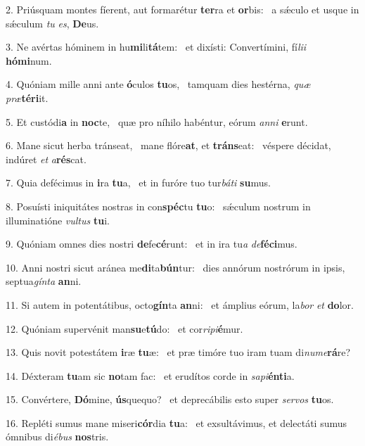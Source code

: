 2. Priúsquam montes fíerent, aut formarétur \textbf{ter}ra et \textbf{or}bis: \ast\  a sǽculo et usque in sǽculum \textit{tu} \textit{es}, \textbf{De}us.\

3. Ne avértas hóminem in hu\textbf{mi}li\textbf{tá}tem: \ast\  et dixísti: Convertímini, fí\textit{li}\textit{i} \textbf{hó}\textbf{mi}num.\

4. Quóniam mille anni ante \textbf{ó}culos \textbf{tu}os, \ast\  tamquam dies hestérna, \textit{quæ} \textit{præ}\textbf{tér}\textbf{i}it.\

5. Et custódi\textbf{a} in \textbf{noc}te, \ast\  quæ pro níhilo habéntur, eórum \textit{an}\textit{ni} \textbf{e}runt.\

6. Mane sicut herba tránseat, \dag\  mane flóre\textbf{at}, et \textbf{tráns}eat: \ast\  véspere décidat, indúret \textit{et} \textit{a}\textbf{rés}cat.\

7. Quia defécimus in \textbf{i}ra \textbf{tu}a, \ast\  et in furóre tuo tur\textit{bá}\textit{ti} \textbf{su}mus.\

8. Posuísti iniquitátes nostras in con\textbf{spéc}tu \textbf{tu}o: \ast\  sǽculum nostrum in illuminatióne \textit{vul}\textit{tus} \textbf{tu}i.\

9. Quóniam omnes dies nostri \textbf{de}fe\textbf{cé}runt: \ast\  et in ira tu\textit{a} \textit{de}\textbf{fé}\textbf{ci}mus.\

10. Anni nostri sicut aránea me\textbf{di}ta\textbf{bún}tur: \ast\  dies annórum nostrórum in ipsis, septua\textit{gín}\textit{ta} \textbf{an}ni.\

11. Si autem in potentátibus, octo\textbf{gín}ta \textbf{an}ni: \ast\  et ámplius eórum, la\textit{bor} \textit{et} \textbf{do}lor.\

12. Quóniam supervénit man\textbf{su}e\textbf{tú}do: \ast\  et cor\textit{ri}\textit{pi}\textbf{é}mur.\

13. Quis novit potestátem \textbf{i}ræ \textbf{tu}æ: \ast\  et præ timóre tuo iram tuam di\textit{nu}\textit{me}\textbf{rá}re?\

14. Déxteram \textbf{tu}am sic \textbf{no}tam fac: \ast\  et erudítos corde in \textit{sa}\textit{pi}\textbf{én}\textbf{ti}a.\

15. Convértere, \textbf{Dó}mine, \textbf{ús}quequo? \ast\  et deprecábilis esto super \textit{ser}\textit{vos} \textbf{tu}os.\

16. Repléti sumus mane miseri\textbf{cór}dia \textbf{tu}a: \ast\  et exsultávimus, et delectáti sumus ómnibus di\textit{é}\textit{bus} \textbf{nos}tris.\


